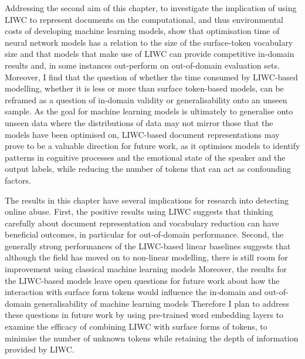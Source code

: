 Addressing the second aim of this chapter, to investigate the implication of using LIWC to represent documents on the computational, and thus environmental costs of developing machine learning models, show that optimisation time of neural network models has a relation to the size of the surface-token vocabulary size and that models that make use of LIWC can provide competitive in-domain results and, in some instances out-perform on out-of-domain evaluation sets. 
Moreover, I find that the question of whether the time consumed by LIWC-based modelling, whether it is less or more than surface token-based models, can be reframed as a question of in-domain validity or generalisability onto an unseen sample.
As the goal for machine learning models is ultimately to generalise onto unseen data where the distributions of data may not mirror those that the models have been optimised on, LIWC-based document representations may prove to be a valuable direction for future work, as it optimises models to identify patterns in cognitive processes and the emotional state of the speaker and the output labels, while reducing the number of tokens that can act as confounding factors.

The results in this chapter have several implications for research into detecting online abuse.
First, the positive results using LIWC suggests that thinking carefully about document representation and vocabulary reduction can have beneficial outcomes, in particular for out-of-domain performance.
Second, the generally strong performances of the LIWC-based linear baselines suggests that although the field has moved on to non-linear modelling, there is still room for improvement using classical machine learning models
Moreover, the results for the LIWC-based models leave open questions for future work about how the interaction with surface form tokens would influence the in-domain and out-of-domain generalisability of machine learning models
Therefore I plan to address these questions in future work by using pre-trained word embedding layers to examine the efficacy of combining LIWC with surface forms of tokens, to minimise the number of unknown tokens while retaining the depth of information provided by LIWC.


